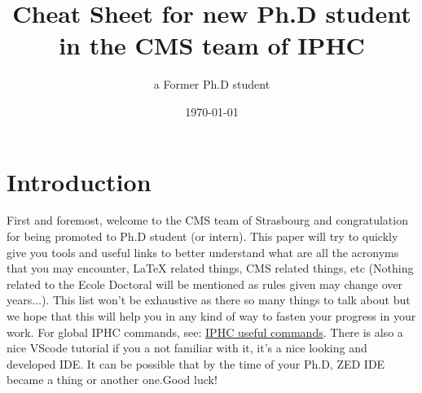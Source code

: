 \documentclass[reprint, a4paper, nofootinbib, amsmath, amssymb, aps]{revtex4-1}
\begin{document}
\title{Cheat Sheet for new Ph.D student in the CMS team of IPHC}

\author{a Former Ph.D student}

\date{\today}

\maketitle

\section{Introduction}

First and foremost, welcome to the CMS team of Strasbourg and congratulation for being promoted to Ph.D student (or intern). This paper will try to quickly give you tools and useful links to better understand what are all the acronyms that you may encounter, LaTeX related things, CMS related things, etc (Nothing related to the Ecole Doctoral will be mentioned as rules given may change over years...). This list won't be exhaustive as there so many things to talk about but we hope that this will help you in any kind of way to fasten your progress in your work. For global IPHC commands, see: \href{https://twiki.cern.ch/twiki/bin/viewauth/CMS/IPHCusefulCommands#VScode}{IPHC useful commands}. There is also a nice VScode tutorial if you a not familiar with it, it's a nice looking and developed IDE. It can be possible that by the time of your Ph.D, ZED IDE became a thing or another one.Good luck!  
\end{document}
